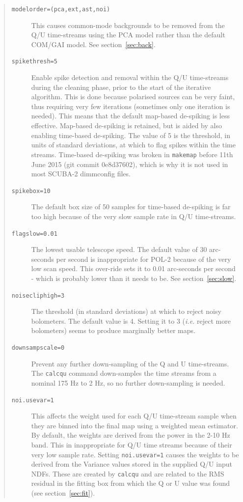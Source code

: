 \documentclass[twoside,11pt]{starlink}
\begin{document}
\begin{quote}
\begin{description}

\item[\texttt{modelorder=(pca,ext,ast,noi)}] This causes common-mode backgrounds
to be removed from the Q/U time-streams using the PCA model rather than
the default COM/GAI model. See section~\ref{sec:back}.

\item[\texttt{spikethresh=5}] Enable spike detection and removal within the Q/U
time-streams during the cleaning phase, prior to the start of the
iterative algorithm. This is done because polarised sources can be very
faint, thus requiring very few iterations (sometimes only one iteration is
needed). This means that the default map-based de-spiking is less
effective. Map-based de-spiking is retained, but is aided by also enabling
time-based de-spiking. The value of 5 is the threshold, in units of
standard deviations, at which to flag spikes within the time streams.
Time-based de-spiking was broken in \texttt{makemap} before 11th June
2015 (git commit 0e8d37602), which is why it is not used in most SCUBA-2
dimmconfig files.

\item[\texttt{spikebox=10}] The default box size of 50 samples for time-based
de-spiking is far too high because of the very slow sample rate in Q/U
time-streams.

\item[\texttt{flagslow=0.01}] The lowest usable telescope speed. The default value
of 30 arc-seconds per second is inappropriate for POL-2 because of the
very low scan speed. This over-ride sets it to 0.01 arc-seconds per
second - which is probably lower than it needs to be. See
section~\ref{sec:slow}.

\item[\texttt{noisecliphigh=3}] The threshold (in standard deviations) at which to
reject noisy bolometers. The default value is 4. Setting it to 3
(\emph{i.e.} reject more bolometers) seems to produce marginally better
maps.

\item[\texttt{downsampscale=0}] Prevent any further down-sampling of the Q and U
time-streams. The \texttt{calcqu} command down-samples the time streams
from a nominal 175 Hz to 2 Hz, so no further down-sampling is needed.

\item[\texttt{noi.usevar=1}] This affects the weight used for each Q/U
time-stream sample when they are binned into the final map using a
weighted mean estimator. By default, the weights are derived from the
power in the 2-10 Hz band. This in inappropriate for Q/U time streams
because of their very low sample rate. Setting \texttt{noi.usevar=1}
causes the weights to be derived from the Variance values stored in the
supplied Q/U input NDFs. These are created by \texttt{calcqu} and are related
to the RMS residual in the fitting box from which the Q or U value was
found (see section~\ref{sec:fit}).

\end{description}
\end{quote}
\end{document}
